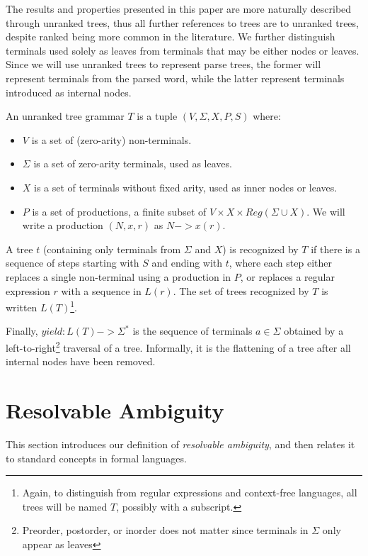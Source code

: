 \documentclass[runningheads]{llncs}
\newcommand{\NT}{V} %
\newcommand{\T}{\Sigma} %
\newcommand{\regex}{\mathit{Reg}}
\begin{document}
The results and properties presented in this paper are more naturally described through unranked trees, thus all further references to trees are to unranked trees, despite ranked being more common in the literature. We further distinguish terminals used solely as leaves from terminals that may be either nodes or leaves. Since we will use unranked trees to represent parse trees, the former will represent terminals from the parsed word, while the latter represent terminals introduced as internal nodes.

An unranked tree grammar $T$ is a tuple $(\NT, \T, X, P, S)$ where:

\begin{itemize}
\item $\NT$ is a set of (zero-arity) non-terminals.
\item $\T$ is a set of zero-arity terminals, used as leaves.
\item $X$ is a set of terminals without fixed arity, used as inner nodes or leaves.
\item $P$ is a set of productions, a finite subset of $\NT \times X \times \regex(\T \cup X)$. We will write a production $(N, x, r)$ as $N -> x(r)$.
\end{itemize}

\noindent A tree $t$ (containing only terminals from $\T$ and $X$) is recognized by $T$ if there is a sequence of steps starting with $S$ and ending with $t$, where each step either replaces a single non-terminal using a production in $P$, or replaces a regular expression $r$ with a sequence in $L(r)$. The set of trees recognized by $T$ is written $L(T)$\footnote{Again, to distinguish from regular expressions and context-free languages, all trees will be named $T$, possibly with a subscript.}.

Finally, $yield : L(T) -> \T^{*}$ is the sequence of terminals $a \in \T$ obtained by a left-to-right\footnote{Preorder, postorder, or inorder does not matter since terminals in $\T$ only appear as leaves} traversal of a tree. Informally, it is the flattening of a tree after all internal nodes have been removed.

\section{Resolvable Ambiguity} \label{sec:resolvable-definition}

This section introduces our definition of \emph{resolvable ambiguity}, and then relates it to standard concepts in formal languages.
\end{document}
